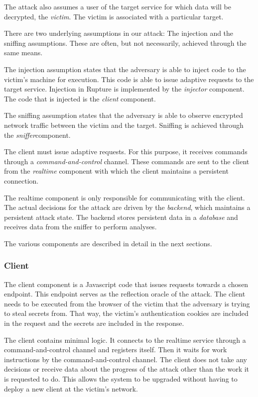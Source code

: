 \documentclass[conference, letterpaper, 10pt]{IEEEtran}
\begin{document}
The attack also assumes a user of the target service for which data will be
decrypted, the \textit{victim}. The victim is associated with a particular
target.

There are two underlying assumptions in our attack: The injection and the
sniffing assumptions. These are often, but not necessarily, achieved through the same means.

The injection assumption states that the adversary is able to inject code to the
victim's machine for execution. This code is able to issue adaptive requests to
the target service. Injection in Rupture is implemented by the
\textit{injector} component. The code that is injected is the \textit{client}
component.

The sniffing assumption states that the adversary is able to observe encrypted network
traffic between the victim and the target.
Sniffing is achieved through the \textit{sniffer}component.

The client must issue adaptive requests. For this purpose, it receives commands
through a \textit{command-and-control} channel. These commands are sent to the
client from the \textit{realtime} component with which the client maintains a
persistent connection.

The realtime component is only responsible for communicating with the client.
The actual decisions for the attack are driven by the \textit{backend}, which
maintains a persistent attack state. The backend stores persistent data in a
\textit{database} and receives data from the sniffer to perform analyses.

The various components are described in detail in the next sections.

\subsubsection{Client}

The client component is a Javascript code that issues requests towards a chosen
endpoint. This endpoint serves as the reflection oracle of the attack. The client
needs to be executed from the browser of the victim that the adversary is trying
to steal secrets from. That way, the victim's authentication cookies are
included in the request and the secrets are included in the
response.

The client contains minimal logic. It connects to the realtime service through
a command-and-control channel and registers itself. Then it waits
for work instructions by the command-and-control channel. The
client does not take any decisions or receive data about the progress of the
attack other than the work it is requested to do.
This allows the system to be upgraded without having to deploy a
new client at the victim's network.
\end{document}
